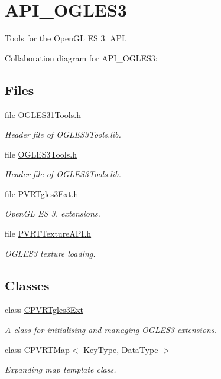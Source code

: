 \hypertarget{group___a_p_i___o_g_l_e_s3}{\section{A\+P\+I\+\_\+\+O\+G\+L\+E\+S3}
\label{group___a_p_i___o_g_l_e_s3}
}


Tools for the Open\+G\+L E\+S 3. A\+P\+I.  


Collaboration diagram for A\+P\+I\+\_\+\+O\+G\+L\+E\+S3\+:
\subsection*{Files}
\begin{DoxyCompactItemize}
\item 
file \hyperlink{_o_g_l_e_s31_tools_8h}{O\+G\+L\+E\+S31\+Tools.\+h}
\begin{DoxyCompactList}\small\item\em Header file of O\+G\+L\+E\+S3\+Tools.\+lib. \end{DoxyCompactList}\item 
file \hyperlink{_o_g_l_e_s3_tools_8h}{O\+G\+L\+E\+S3\+Tools.\+h}
\begin{DoxyCompactList}\small\item\em Header file of O\+G\+L\+E\+S3\+Tools.\+lib. \end{DoxyCompactList}\item 
file \hyperlink{_p_v_r_tgles3_ext_8h}{P\+V\+R\+Tgles3\+Ext.\+h}
\begin{DoxyCompactList}\small\item\em Open\+G\+L E\+S 3. extensions. \end{DoxyCompactList}\item 
file \hyperlink{_2_p_v_r_t_texture_a_p_i_8h}{P\+V\+R\+T\+Texture\+A\+P\+I.\+h}
\begin{DoxyCompactList}\small\item\em O\+G\+L\+E\+S3 texture loading. \end{DoxyCompactList}\end{DoxyCompactItemize}
\subsection*{Classes}
\begin{DoxyCompactItemize}
\item 
class \hyperlink{class_c_p_v_r_tgles3_ext}{C\+P\+V\+R\+Tgles3\+Ext}
\begin{DoxyCompactList}\small\item\em A class for initialising and managing O\+G\+L\+E\+S3 extensions. \end{DoxyCompactList}\item 
class \hyperlink{singleton_c_p_v_r_t_map}{C\+P\+V\+R\+T\+Map$<$ Key\+Type, Data\+Type $>$}
\begin{DoxyCompactList}\small\item\em Expanding map template class. \end{DoxyCompactList}\end{DoxyCompactItemize}
